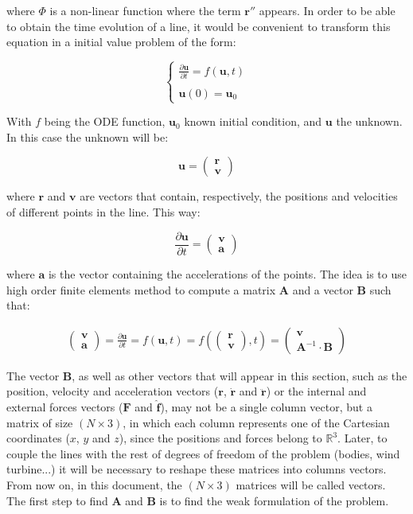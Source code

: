 \documentclass[10pt] {article}
\newcommand{\bean}{\begin{eqnarray}}
\newcommand{\eean}{\end{eqnarray}}
\newcommand{\ba}{\begin{array}}
\newcommand{\ea}{\end{array}}
\newcommand{\pa}{\partial}
\begin{document}
where $\Phi$ is a non-linear function where the term $\mathbf{r}''$ appears. In order to be able to obtain the time evolution of a line, it would be convenient to transform this equation in a initial value problem of the form:

$$\left\{ \ba{l} \frac{\pa\mathbf{u}}{\pa t} = f(\mathbf{u}, t) \\  \\ \mathbf{u}(0) = \mathbf{u}_0 \ea \right.$$

With $f$ being the ODE function, $\mathbf{u}_0$ known initial condition, and $\mathbf{u}$ the unknown. In this case the unknown will be: 

$$\mathbf{u}=\left(\ba{c} \mathbf{r} \\ \mathbf{v} \ea\right) $$

where $\mathbf{r}$ and $\mathbf{v}$ are vectors that contain, respectively, the positions and velocities of different points in the line. This way: 

$$\frac{\pa\mathbf{u}}{\pa t}=\left(\ba{c} \mathbf{v} \\ \mathbf{a} \ea\right)$$

where $\mathbf{a}$ is the vector containing the accelerations of the points. The idea is to use high order finite elements method to compute a matrix $\mathbf{A}$ and a vector $\mathbf{B}$ such that:

\bean
\left(\ba{c} \mathbf{v} \\ \mathbf{a} \ea\right) = \frac{\pa\mathbf{u}}{\pa t} = f(\mathbf{u}, t) = f(\left(\ba{c} \mathbf{r} \\ \mathbf{v} \ea\right), t) = \left(\ba{c} \mathbf{v} \\ \mathbf{A}^{-1}\cdot\mathbf{B} \ea\right)
\label{system-function}
\eean

The vector $\mathbf{B}$, as well as other vectors that will appear in this section, such as the position, velocity and acceleration vectors ($\mathbf{r}$, $\mathbf{\dot{r}}$ and $\mathbf{\ddot{r}}$) or the internal and external forces vectors ($\mathbf{F}$ and $\mathbf{\hat{f}}$), may not be a single column vector, but a matrix of size $(N\times 3)$, in which each column represents one of the Cartesian coordinates ($x$, $y$ and $z$), since the positions and forces belong to $\mathbb{R}^3$. Later, to couple the lines with the rest of degrees of freedom of the problem (bodies, wind turbine...) it will be necessary to reshape these matrices into columns vectors. From now on, in this document, the $(N\times 3)$ matrices will be called vectors. The first step to find $\mathbf{A}$ and $\mathbf{B}$ is to find the weak formulation of the problem.\\
\end{document}
